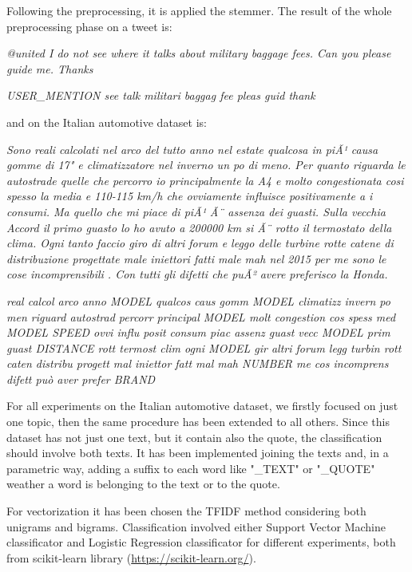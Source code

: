 Following the preprocessing, it is applied the stemmer. The result of the whole preprocessing phase on a tweet is:

\begin{description}
	\item \textit{@united I do not see where it talks about military baggage fees. Can you please guide me. Thanks}
	\item \textit{USER\_MENTION see talk militari baggag fee  pleas guid  thank
	}
\end{description}

and on the Italian automotive dataset is:

\begin{description}
	\item \textit{Sono reali calcolati nel arco del tutto anno nel estate qualcosa in piÃ¹ causa gomme di 17" e climatizzatore nel inverno un po di meno. Per quanto riguarda le autostrade quelle che percorro io principalmente la A4 e molto congestionata cosi spesso la media e 110-115 km/h che ovviamente influisce positivamente a i consumi. Ma quello che mi piace di piÃ¹ Ã¨ assenza dei guasti. Sulla vecchia Accord il primo guasto lo ho avuto a 200000 km si Ã¨ rotto il termostato della clima. Ogni tanto faccio giro di altri forum e leggo delle turbine rotte catene di distribuzione progettate male iniettori fatti male mah nel 2015 per me sono le cose incomprensibili . Con tutti gli difetti che puÃ² avere preferisco la Honda. }
	
	\item \textit{real calcol arco anno MODEL qualcos caus gomm MODEL climatizz invern po men riguard autostrad percorr principal MODEL molt congestion cos spess med MODEL SPEED ovvi influ posit consum piac assenz guast vecc MODEL prim guast DISTANCE rott termost clim ogni MODEL gir altri forum legg turbin rott caten distribu progett mal iniettor fatt mal mah NUMBER me cos incomprens difett può aver prefer BRAND}
\end{description}

For all experiments on the Italian automotive dataset, we firstly focused on just one topic, then the same procedure has been extended to all others. Since this dataset has not just one text, but it contain also the quote, the classification should involve both texts. It has been implemented joining the texts and, in a parametric way, adding a suffix to each word like "\_TEXT" or "\_QUOTE" weather a word is belonging to the text or to the quote.

For vectorization it has been chosen the \ac{TFIDF} method considering both unigrams and bigrams. Classification involved either Support Vector Machine classificator and Logistic Regression classificator for different experiments, both from scikit-learn library (\url{https://scikit-learn.org/}).


